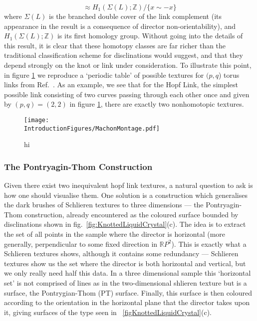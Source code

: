 \begin{equation}
[M-L, \mathbb{R}P^2] \approx H_1(\Sigma(L); \mathbb{Z})/\{ x \sim -x\}
\end{equation}
where $\Sigma(L)$ is the branched double cover of the link complement (its appearance in the result is a consequence of director non-orientability), and $H_1(\Sigma(L); \mathbb{Z})$ is its first homology group. Without going into the details of this result, it is clear that these homotopy classes are far richer than the traditional classification scheme for disclinations would suggest, and that they depend strongly on the knot or link under consideration. To illustrate this point, in figure \ref{fig:MachonMontage} we reproduce a `periodic table' of possible textures for $(p,q$) torus links from Ref.~\cite{Machon}. As an example, we see that for the Hopf Link, the simplest possible link consisting of two curves passing through each other once and given by $(p,q)=(2,2)$ in figure \ref{fig:MachonMontage}, there are exactly two nonhomotopic textures. 
\begin{figure}[htbp]
\centering
\texttt{[image: \\IntroductionFigures/MachonMontage.pdf]}
\caption{hi }
\label{fig:MachonMontage}
\end{figure}
\subsubsection{The Pontryagin-Thom Construction}
Given there exist two inequivalent hopf link textures, a natural question to ask is how one should visualise them. One solution is a construction which generalises the dark brushes of Schlieren textures to three dimensions --- the Pontryagin-Thom construction, already encountered as the coloured surface bounded by disclinations shown in fig.~\ref{fig:KnottedLiquidCrystal}(c). The idea is to extract the set of all points in the sample where the director is horizontal (more generally, perpendicular to some fixed direction in $\mathbb{R}P^2$).  This is exactly what a Schlieren textures shows, although it contains some redundancy --- Schlieren textures show us the set where the director is both horizontal and vertical, but we only really need half this data. In a three dimensional sample this `horizontal set' is not comprised of lines as in the two-dimensional shlieren texture but is a surface, the Pontrygian-Thom (PT) surface. Finally, this surface is then coloured according to the orientation in the horizontal plane that the director takes upon it, giving surfaces of the type seen in \fig~\ref{figKnottedLiquidCrystal}(c).
